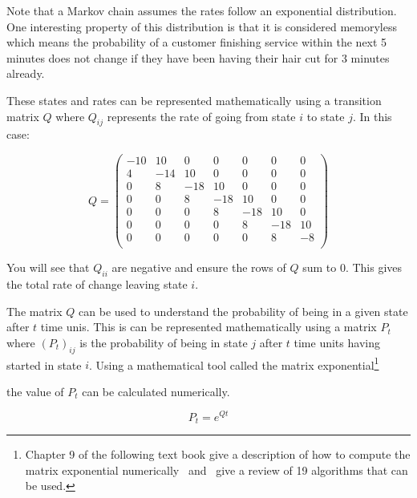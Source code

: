 Note that a Markov chain assumes the rates follow an exponential distribution.
One interesting property of this distribution is that it is considered
memoryless which means the probability of a customer finishing service
within the next 5 minutes does not change if they have been
having their hair cut for 3 minutes already.

These states and rates can be represented mathematically using a transition
matrix \(Q\) where \(Q_{ij}\) represents the rate of going from state \(i\) to
state \(j\). In this case:

\begin{equation}
Q =
\begin{pmatrix}
-10 &  10 &   0 &   0 &   0 &   0 &   0\\
  4 & -14 &  10 &   0 &   0 &   0 &   0\\
  0 &   8 & -18 &  10 &   0 &   0 &   0\\
  0 &   0 &   8 & -18 &  10 &   0 &   0\\
  0 &   0 &   0 &   8 & -18 &  10 &   0\\
  0 &   0 &   0 &   0 &   8 & -18 &  10\\
  0 &   0 &   0 &   0 &   0 &   8 &  -8\\
 \end{pmatrix}
 \label{eqn:barber_shop_transition_matrix}
\end{equation}

You will see that \(Q_{ii}\) are negative and ensure the rows of \(Q\) sum to 0.
This gives the total rate of change leaving state \(i\).

The matrix \(Q\) can be used to understand the probability of being in a given state after
\(t\) time unis. This is can be represented mathematically using a matrix
\(P_{t}\) where \((P_{t})_{ij}\) is the probability of being in state \(j\)
after \(t\) time units having started in state \(i\). Using a mathematical tool
called the matrix exponential\footnote{

Chapter 9 of the following text book give a description of how to compute the
matrix exponential numerically~\cite{van1996matrix}
and~\cite{moler1978nineteen, moler2003nineteen} give a review of 19
algorithms that can be used.
}

the value of \(P_{t}\) can be calculated numerically.

\begin{equation}
    P_t = e^{Qt}
    \label{eqn:continuous_time_markov_process_matrix_exponential}
\end{equation}


